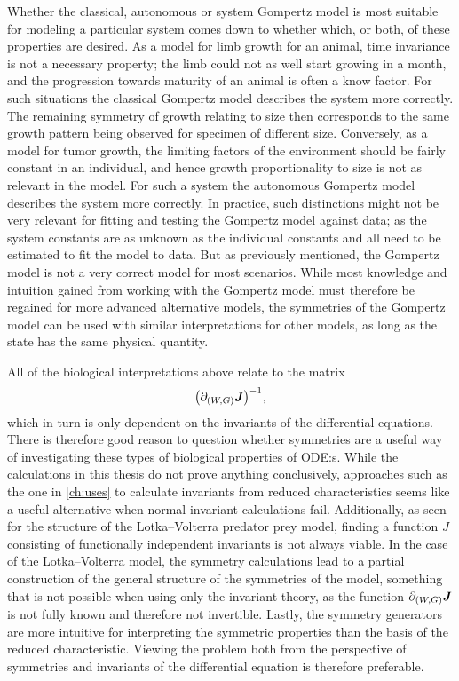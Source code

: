 Whether the classical, autonomous or system Gompertz model is most suitable for modeling a particular system comes down to whether which, or both, of these properties are desired.
As a model for limb growth for an animal, time invariance is not a necessary property; the limb could not as well start growing in a month, and the progression towards maturity of an animal is often a know factor.
For such situations the classical Gompertz model describes the system more correctly.
The remaining symmetry of growth relating to size then corresponds to the same growth pattern being observed for specimen of different size.
Conversely, as a model for tumor growth, the limiting factors of the environment should be fairly constant in an individual, and hence growth proportionality to size is not as relevant in the model.
For such a system the autonomous Gompertz model describes the system more correctly.
In practice, such distinctions might not be very relevant for fitting and testing the Gompertz model against data; as the system constants are as unknown as the individual constants and all need to be estimated to fit the model to data.
But as previously mentioned, the Gompertz model is not a very correct model for most scenarios.
While most knowledge and intuition gained from working with the Gompertz model must therefore be regained for more advanced alternative models, the symmetries of the Gompertz model can be used with similar interpretations for other models, as long as the state has the same physical quantity.

All of the biological interpretations above relate to the matrix
\begin{equation*}
  \left(\partial_{(W, G)} \vect{J}\right)^{-1},
\end{equation*}
which in turn is only dependent on the invariants of the differential equations.
There is therefore good reason to question whether symmetries are a useful way of investigating these types of biological properties of ODE:s.
While the calculations in this thesis do not prove anything conclusively, approaches such as the one in \cref{ch:uses} to calculate invariants from reduced characteristics seems like a useful alternative when normal invariant calculations fail.
Additionally, as seen for the structure of the Lotka--Volterra predator prey model, finding a function \(J\) consisting of functionally independent invariants is not always viable.
In the case of the Lotka--Volterra model, the symmetry calculations lead to a partial construction of the general structure of the symmetries of the model, something that is not possible when using only the invariant theory, as the function \(\partial_{(W, G)} \boldsymbol{J}\) is not fully known and therefore not invertible.
Lastly, the symmetry generators are more intuitive for interpreting the symmetric properties than the basis of the reduced characteristic.
Viewing the problem both from the perspective of symmetries and invariants of the differential equation is therefore preferable.

